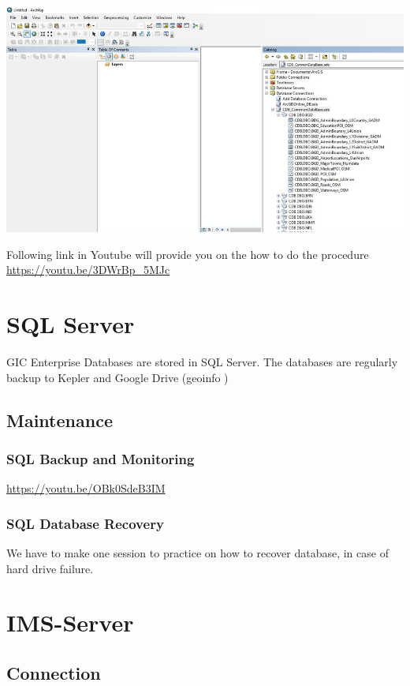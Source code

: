 \documentclass[]{book}
\theoremstyle{definition}
\theoremstyle{definition}
\theoremstyle{definition}
\theoremstyle{remark}
\begin{document}
\begin{center}\includegraphics[width=0.7\linewidth]{img/fig43_arcgis11} \end{center}

Following link in Youtube will provide you on the how to do the
procedure \url{https://youtu.be/3DWrBp_5MJc}

\section{SQL Server}\label{sql-server}

GIC Enterprise Databases are stored in SQL Server. The databases are
regularly backup to Kepler and Google Drive (geoinfo )

\subsection{Maintenance}\label{maintenance}

\subsubsection{SQL Backup and
Monitoring}\label{sql-backup-and-monitoring}

\url{https://youtu.be/OBk0SdeB3IM}

\subsubsection{SQL Database Recovery}\label{sql-database-recovery}

We have to make one session to practice on how to recover database, in
case of hard drive failure.

\section{IMS-Server}\label{ims-server}

\subsection{Connection}\label{connection}
\end{document}
